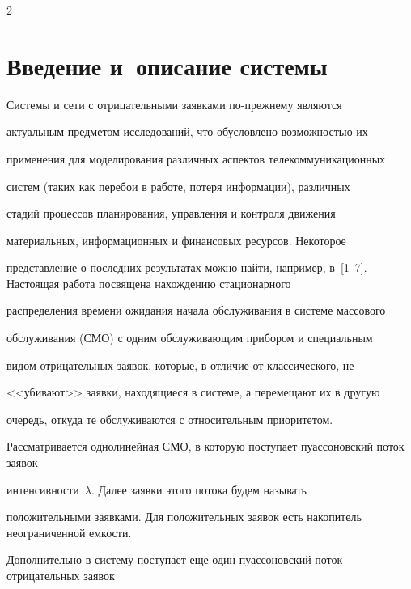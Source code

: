      \begin{multicols}{2}





            \label{st\stat}








\section{Введение и~описание системы}





Системы и сети с отрицательными заявками по-преж\-не\-му являются


актуальным предметом исследований, что обусловлено возможностью их


применения для моделирования различных аспектов телекоммуникационных


систем (таких как перебои в работе, потеря информации), различных


стадий процессов планирования, управления и контроля движения


материальных, информационных и финансовых ресурсов. Некоторое


представление о последних результатах можно найти, например, в~[1--7]. Настоящая работа посвящена нахождению стационарного


распределения времени ожидания начала обслуживания в системе массового


обслуживания (СМО) с одним обслуживающим прибором и специальным


видом отрицательных заявок, которые, в отличие от классического, не


<<убивают>> заявки, находящиеся в системе, а перемещают их в другую


очередь, откуда те обслуживаются с относительным приоритетом.





Рассматривается однолинейная СМО, в которую поступает пуассоновский поток заявок


интенсивности~$\lambda$. Далее заявки этого потока будем называть


положительными заявками. Для положительных заявок есть накопитель неограниченной емкости.


Дополнительно в сис\-те\-му поступает еще один пуассоновский поток отрицательных заявок



\end{multicols}
